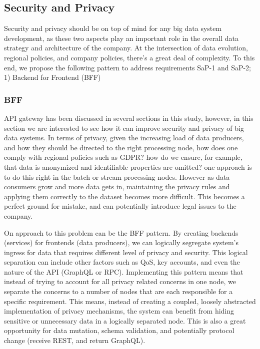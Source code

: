 \documentclass[conference]{IEEEtran}
\begin{document}
\subsection{Security and Privacy}

Security and privacy should be on top of mind for any big data system development, as these two aspects play an important role in the overall data strategy and architecture of the company. At the intersection of data evolution, regional policies, and company policies, there's a great deal of complexity. To this end, we propose the following pattern to address requirements SaP-1 and SaP-2; 1) Backend for Frontend (BFF)

\subsubsection{BFF}

API gateway has been discussed in several sections in this study, however, in this section we are interested to see how it can improve security and privacy of big data systems. In terms of privacy, given the increasing load of data producers, and how they should be directed to the right processing node, how does one comply with regional policies such as GDPR? how do we ensure, for example, that data is anonymized and identifiable properties are omitted? one approach is to do this right in the batch or stream processing nodes. However as data consumers grow and more data gets in, maintaining the privacy rules and applying them correctly to the dataset becomes more difficult. This becomes a perfect ground for mistake, and can potentially introduce legal issues to the company. 

On approach to this problem can be the BFF pattern. By creating backends (services) for frontends (data producers), we can logically segregate system's ingress for data that requires different level of privacy and security. This logical separation can include other factors such as QoS, key accounts, and even the nature of the API (GraphQL or RPC). Implementing this pattern means that instead of trying to account for all privacy related concerns in one node, we separate the concerns to a number of nodes that are each responsible for a specific requirement. This means, instead of creating a coupled, loosely abstracted implementation of privacy mechanisms, the system can benefit from hiding sensitive or unnecessary data in a logically separated node. This is also a great opportunity for data mutation, schema validation, and potentially protocol change (receive REST, and return GraphQL).
\end{document}
